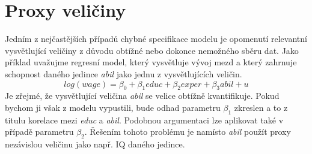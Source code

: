 \section{Proxy veličiny}

Jedním z nejčastějších případů chybné specifikace modelu je opomenutí relevantní vysvětlující veličiny z důvodu obtížné nebo dokonce nemožného sběru dat. Jako příklad uvažujme regresní model, který vysvětluje vývoj mezd a který zahrnuje schopnost daného jedince \textit{abil} jako jednu z vysvětlujících veličin.
\begin{equation}
log(wage) = \beta_0 + \beta_1 educ + \beta_2 exper + \beta_3 abil + u
\end{equation}
Je zřejmé, že vysvětlující veličina \textit{abil} se velice obtížně kvantifikuje. Pokud bychom ji však z modelu vypustili, bude odhad parametru $\beta_1$ zkreslen a to z titulu korelace mezi \textit{educ} a \textit{abil}. Podobnou argumentaci lze aplikovat také v případě parametru $\beta_2$. Řešením tohoto problému je namísto \textit{abil} použít proxy nezávislou veličinu jako např. IQ daného jedince.


